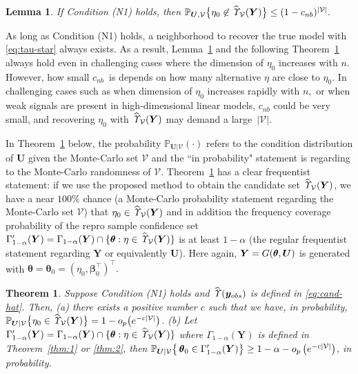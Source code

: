 \documentclass[12pt]{article}
\theoremstyle{shortspace}
\newtheorem{theorem}{Theorem}
\newtheorem{lemma}{Lemma}
\def\*#1{\bm{#1}}
\def\btheta{\mathop{\theta\kern-.45em\hbox{$\theta$}}\nolimits}
\def\P{\mathbb P}
\begin{document}
\begin{lemma}
\label{lemma:p_bound_C_D_general} 
If Condition (N1) holds, 
then $
    \P_{\*U, {\mathcal V}}\big\{\eta_0 \not\in \widehat{\it \Upsilon}_{{\mathcal V}}(\*Y)\big\} \leq (1-c_{nb})^{|{\mathcal V}|}.
$
\end{lemma}
As long as Condition (N1) holds, a neighborhood to recover the true model with \eqref{eq:tau-star} always exists.
As a result, Lemma~\ref{lemma:p_bound_C_D_general} and the following Theorem~\ref{thm:p_bound_C_D_general} always hold even in challenging cases where the dimension of $\eta_0$ increases with $n.$ However, how small $c_{nb}$~is depends on how many alternative $\eta$ are close to $\eta_0.$ In challenging cases such as when dimension of $\eta_0$ increases rapidly with $n,$ or when weak signals are present in high-dimensional linear models, $c_{nb}$ could be very small, and recovering $\eta_0$ with $\widehat{\it \Upsilon}_{{\mathcal V}}(\*Y)$ may demand a large~$|\mathcal V|.$  


In Theorem~\ref{thm:p_bound_C_D_general} below, the probability  $\P_{\*U|{\mathcal V}}(\cdot)$ refers to the condition distribution of $\*U$ given the Monte-Carlo set ${\mathcal V}$ and the ``in probability" statement is regarding to the Monte-Carlo randomness of ${\mathcal V}$. Theorem~\ref{thm:p_bound_C_D_general} 
has a clear 
frequentist statement: 
if we use the proposed method to obtain the candidate set $\widehat{\it \Upsilon}_{{\mathcal V}}(\*Y)$, we have a near $100\%$ chance (a Monte-Carlo probability statement regarding the Monte-Carlo set ${\mathcal V}$) that $\eta_0 \in \widehat{\it \Upsilon}_{{\mathcal V}}(\*Y)$ and in addition 
the frequency coverage probability of the repro sample confidence set $\Gamma_{1-\alpha}'(\*Y) = \Gamma_{1-\alpha}(\*Y) \cap \{ \btheta: \eta \in \widehat{\it \Upsilon}_{{\mathcal V}}(\*Y)\}$ is
at least $1 - \alpha$ (the regular frequentist statement regarding $\*Y$ or equivalently $\*U$). Here again, $\*Y = G(\btheta, \*U)$ is generated with $\*\theta = \*\theta_0 = (\eta_0, \*\beta_0^\top)^\top.$ 
\begin{theorem}
\label{thm:p_bound_C_D_general}
 Suppose Condition (N1) holds and $\widehat{\it \Upsilon}(\*y_{obs})$ is defined in \eqref{eq:cand-hat}. Then, (a) there exists a positive number $c$ such that we have, in probability, 
  $\P_{\*U|{\mathcal V}}\big\{\eta_0 \in \widehat{\it \Upsilon}_{{\mathcal V}}(\*Y)\big\} = 1 - o_p\big(e^{-c|{\mathcal V}|}\big)
 	$.
 (b) Let $\Gamma_{1-\alpha}'(\*Y) = \Gamma_{1-\alpha}(\*Y) \cap \{ \btheta: \eta \in \widehat{\it \Upsilon}_{{\mathcal V}}(\*Y)\}$ where $\Gamma_{1-\alpha}(\*Y)$ is defined in Theorem~\ref{thm:1} or \ref{thm:2}, then
 $\P_{\*U|{\mathcal V}}\big\{\btheta_0 \in \Gamma_{1-\alpha}'(\*Y)\big\} \geq 1- \alpha -o_p\left(e^{-c|{\mathcal V}|}\right)$, in probability.
\end{theorem}
\end{document}
